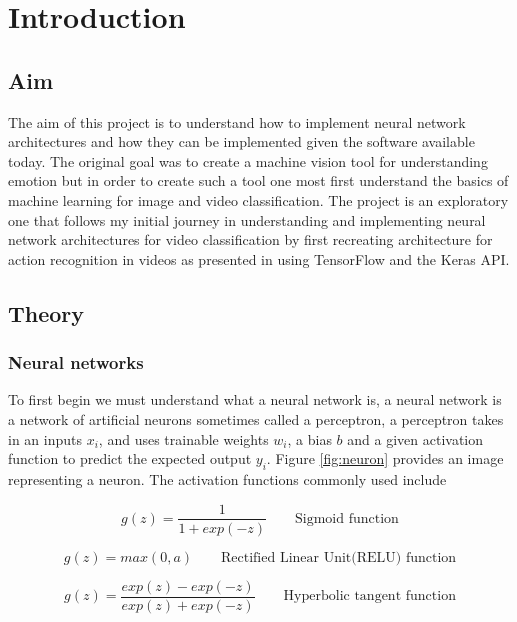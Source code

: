 \chapter{Introduction}
\label{chapterlabel1}

\section{Aim}
The aim of this project is to understand how to implement neural network architectures and how they can be implemented given the software available today. The original goal was to create a machine vision tool for understanding emotion but in order to create such a tool one most first understand the basics of machine learning for image and video classification. The project is an exploratory one that follows my initial journey in understanding and implementing neural network architectures for video classification by first recreating architecture for action recognition in videos as presented in  using TensorFlow and the Keras API.

\section{Theory}
\subsection{Neural networks}
To first begin we must understand what a neural network is, a neural network is a network of artificial neurons sometimes called a perceptron, a perceptron takes in an inputs $x_i$, and uses trainable weights $w_i$, a bias $b$ and a given activation function to predict the expected output $y_i$. Figure \ref{fig:neuron} provides an image representing a neuron. The activation functions commonly used include 

\begin{equation}
g(z) = \frac{1}{1+ exp(-z)}
 \qquad \text{Sigmoid function}
\end{equation}

\begin{equation}
g(z) = max(0,a)
 \qquad \text{Rectified Linear Unit(RELU) function}
\end{equation}

\begin{equation}
g(z) = \frac{exp(z)-exp(-z)}{exp(z) + exp(-z)}
 \qquad \text{Hyperbolic tangent function}
\end{equation}

